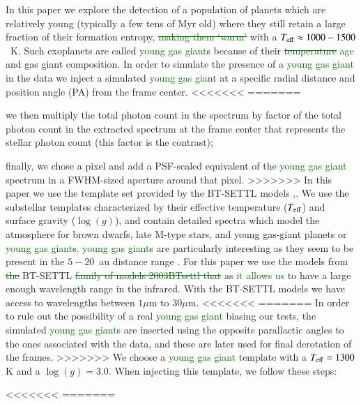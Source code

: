 \documentclass{aa}
\newcommand{\newchange}[1]{\textcolor{darkgreen}{#1}}
\begin{document}
{In this paper we explore the detection of a population of planets which are relatively young (typically a few tens of Myr old) where they still retain a large fraction of their formation entropy, \newchange{\sout{making them `warm'}} with a $T_{\rm eff}\approx 1000 - 1500$~K.
Such exoplanets are called \newchange{young gas giant}s because of their \newchange{\sout{temperature} age} and gas giant composition.
In order to simulate the presence of a \newchange{young gas giant} in the data we inject a simulated \newchange{young gas giant} at a specific radial distance and position angle (PA) from the frame center.
<<<<<<<
=======
    \item we then multiply the total photon count in the spectrum by factor of the total photon count in the extracted spectrum at the frame center that represents the stellar photon count (this factor is the contrast);
    \item finally, we chose a pixel and add a PSF-scaled equivalent of the \newchange{young gas giant} spectrum in a FWHM-sized aperture around that pixel.
>>>>>>>
In this paper we use the template set provided by the BT-SETTL models \citep{1997Allard, 2011Allard,2003BTsettl}\newchange{,\citep[][]{2003BTsettl}}. 
We use the substellar templates characterized by their effective temperature ($T_{\rm{eff}}$) and surface gravity ($\log(g)$), and contain detailed spectra which model the atmosphere for brown dwarfs, late M-type stars, and young gas-giant planets or \newchange{young gas giant}s.
\newchange{young gas giant}s are particularly interesting as they seem to be present in the $5-20$~au distance range \cite{2016Bryan}.
For this paper we use the models from \newchange{\sout{the}} BT-SETTL \newchange{\sout{family of models 2003BTsettl that}} as \newchange{it allows us} to have a large enough wavelength range in the infrared. 
With the BT-SETTL models we have access to wavelengths between $1\mu$m to $30\mu$m.
<<<<<<<
=======
In order to rule out the possibility of a real \newchange{young gas giant} biasing our tests, the simulated \newchange{young gas giant}s are inserted using the opposite parallactic angles to the ones associated with the data, and these are later used for final derotation of the frames.
>>>>>>>
We choose a \newchange{young gas giant} template with a $T_{\rm eff} = 1300$K and a $\log(g)=3.0$.
When injecting this template, we follow these steps:
\begin{enumerate}
<<<<<<<
=======

\end{enumerate}}
\end{document}

